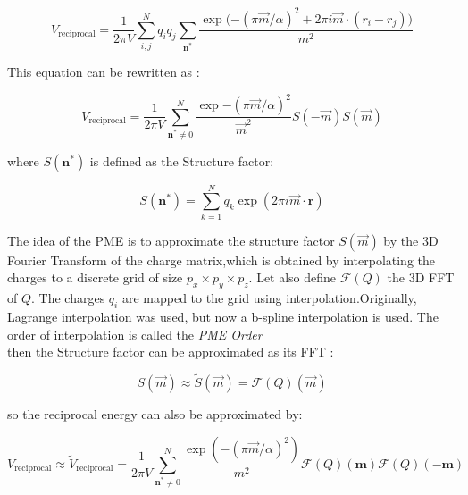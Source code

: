 \documentclass[10pt,twoside,a4paper]{report}
\begin{document}
\begin{equation*}
    V_{\text{reciprocal}} =\frac{1}{2 \pi V} \sum\limits_{i,j}^{N} q_i q_j \sum\limits_{\textbf{n}^*} \frac{\exp{(-(\pi \overrightarrow{m}/\alpha)^2} +2\pi i \overrightarrow{m} \cdot (r_i - r_j))}{m^2}    
\end{equation*}



This equation can be rewritten as :

\begin{equation*}
    V_{\text{reciprocal}} =\frac{1}{2 \pi V} \sum\limits_{\textbf{n}^* \neq 0}^{N}  \frac{\exp{-(\pi \overrightarrow{m}/\alpha)^2}}{\overrightarrow{m}^2}S(-\overrightarrow{m} )S(\overrightarrow{m} )
\end{equation*}

where $S(\textbf{n}^* )$ is defined as the Structure factor:

\begin{equation}
    S(\textbf{n}^* ) = \sum\limits_{k=1}^{N} {q_k \exp(2 \pi i \vec{m} \cdot \textbf{r}) }
\end{equation}


The idea of the PME is to approximate the structure factor $S(\vec{m})$ by the 3D Fourier Transform of the charge matrix,which is obtained by interpolating the charges to a discrete grid of size $ p_x \times p_y \times p_z $. 
	Let also define $\mathcal{F}(Q)$ the 3D FFT of $Q$. The charges $q_i$ are mapped to the grid using interpolation.Originally, Lagrange interpolation was used, but now a b-spline interpolation is used. The order of interpolation is called the \textit{PME Order}\\

then the Structure factor can be approximated as its FFT :

\begin{equation}
   S(\overrightarrow{m}) \approx \widetilde{S}(\overrightarrow{m}) = \mathcal{F}(Q)(\overrightarrow{m})
\end{equation}

so the reciprocal energy can also be approximated by:

\begin{equation}
   V_{\text{reciprocal}} \approx \widetilde{V}_{\text{reciprocal}}   =\frac{1}{2 \pi V} \sum\limits_{\textbf{n}^* \neq 0}^{N}  \frac{\exp{(-(\pi \overrightarrow{m}/\alpha)^2)}}{m^2}\mathcal{F}(Q)(\textbf{m})\mathcal{F}(Q)(-\textbf{m})
\end{equation} \\
\end{document}
